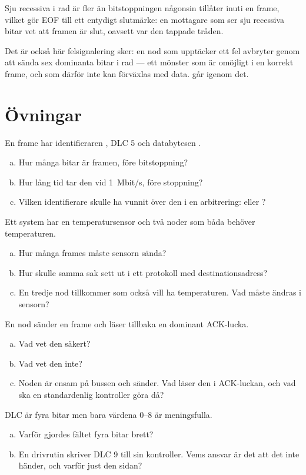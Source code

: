 Sju recessiva i rad är fler än bitstoppningen någonsin tillåter inuti en frame, vilket gör EOF
till ett entydigt slutmärke: en mottagare som ser sju recessiva bitar vet att framen är slut,
oavsett var den tappade tråden.

Det är också här felsignalering sker: en nod som upptäcker ett fel avbryter genom att sända sex
dominanta bitar i rad --- ett mönster som är omöjligt i en korrekt frame, och som därför inte kan
förväxlas med data.  går igenom det.

\section*{Övningar}

\label{ex:2:1}
En frame har identifieraren , DLC 5 och databytesen .
\begin{enumerate}[a)]
  \item Hur många bitar är framen, före bitstoppning?
  \item Hur lång tid tar den vid 1~Mbit/s, före stoppning?
  \item Vilken identifierare skulle ha vunnit över den i en arbitrering:  eller
    ?
\end{enumerate}

\label{ex:2:2}
Ett system har en temperatursensor och två noder som båda behöver temperaturen.
\begin{enumerate}[a)]
  \item Hur många frames måste sensorn sända?
  \item Hur skulle samma sak sett ut i ett protokoll med destinationsadress?
  \item En tredje nod tillkommer som också vill ha temperaturen. Vad måste ändras i sensorn?
\end{enumerate}

\label{ex:2:3}
En nod sänder en frame och läser tillbaka en dominant ACK-lucka.
\begin{enumerate}[a)]
  \item Vad vet den säkert?
  \item Vad vet den inte?
  \item Noden är ensam på bussen och sänder. Vad läser den i ACK-luckan, och vad ska en
    standardenlig kontroller göra då?
\end{enumerate}

\label{ex:2:4}
DLC är fyra bitar men bara värdena 0--8 är meningsfulla.
\begin{enumerate}[a)]
  \item Varför gjordes fältet fyra bitar brett?
  \item En drivrutin skriver DLC 9 till sin kontroller. Vems ansvar är det att det inte händer,
    och varför just den sidan?
\end{enumerate}
